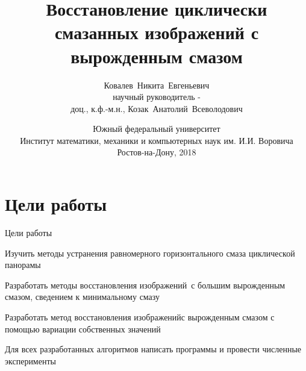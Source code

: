 \documentclass[10pt]{beamer}
\title{Восстановление циклически смазанных изображений с вырожденным смазом}
\author[Ковалев~Н.~Е.]{Ковалев~Никита~Евгеньевич\\научный руководитель -\\доц., к.ф.-м.н., Козак~Анатолий~Всеволодович}
\institute[ЮФУ, ИММиКН]{}
\date{Южный федеральный университет\\ Институт математики, механики и компьютерных наук им. И.И. Воровича\\ \vspace{5mm}Ростов-на-Дону, 2018}
\newcounter{qcounter}
\begin{document}
\begin{frame}
\maketitle
\end{frame}


\section{Цели работы}
\begin{frame}
\begin{block}{\LARGE{Цели работы}}
\begin{list}{)~}{}
\item Изучить методы устранения равномерного горизонтального смаза циклической панорамы
\item Разработать методы восстановления изображений~с большим вырожденным смазом, сведением к минимальному смазу
\item Разработать метод восстановления изображенийс вырожденным смазом с помощью вариации собственных значений
\item Для всех разработанных алгоритмов написать программы и провести численные эксперименты
\end{list}
\end{block}
\end{frame}
\end{document}
